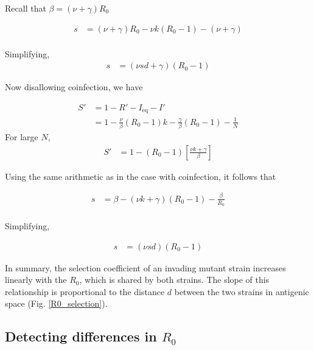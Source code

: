 \documentclass[10pt]{article}
\begin{document}
Recall that $\beta = (\nu + \gamma) R_0$

\begin{align*}
s &= (\nu +\gamma)R_0 - \nu k (R_0-1) - (\nu+\gamma)\\
\end{align*}

Simplifying,
\begin{align}\tag{S1}
s&= (\nu sd + \gamma)(R_0 -1 ) 
\end{align}

Now disallowing coinfection, we have 

\begin{align*}
S' &= 1-R'-I_\text{eq}-I'\\
&= 1- \frac{\nu}{\beta}(R_0-1)k - \frac{\gamma}{\beta}(R_0-1) - \frac{1}{N}
\end{align*}
For large $N$,
\begin{align*}
S' &=1 - (R_0-1)[\frac{\nu k + \gamma}{\beta}] 
\end{align*}

Using the same arithmetic as in the case with coinfection, it follows that

\begin{align*}
s &= \beta-(\nu k + \gamma)(R_0-1) - \frac{\beta}{R_0}\\
\end{align*}

Simplifying,

\begin{align}\tag{S2}
s&=(\nu sd)(R_0-1)
\end{align}

In summary, the selection coefficient of an invading mutant strain increases linearly with the $R_0$, which is shared by both strains. 
The slope of this relationship is proportional to the distance $d$ between the two strains in antigenic space (Fig. \ref{R0_selection}).

\subsection{Detecting differences in $R_0$}
\end{document}
